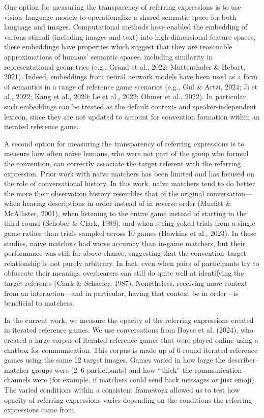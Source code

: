 \documentclass[10pt, letterpaper]{article}
\begin{document}
One option for measuring the transparency of referring expressions is to
use vision--language models to operationalize a shared semantic space
for both language and images. Computational methods have enabled the
embedding of various stimuli (including images and text) into
high-dimensional feature spaces; these embeddings have properties which
suggest that they are reasonable approximations of humans' semantic
spaces, including similarity in representational geometries (e.g., Grand
et al., 2022; Muttenthaler \& Hebart, 2021). Indeed, embeddings from
neural network models have been used as a form of semantics in a range
of reference game scenarios (e.g., Gul \& Artzi, 2024; Ji et al., 2022;
Kang et al., 2020; Le et al., 2022; Ohmer et al., 2022). In particular,
such embeddings can be treated as the default context- and
speaker-independent lexicon, since they are not updated to account for
convention formation within an iterated reference game.

A second option for measuring the transparency of referring expressions
is to measure how often naïve humans, who were not part of the group who
formed the convention, can correctly associate the target referent with
the referring expression. Prior work with naïve matchers has been
limited and has focused on the role of conversational history. In this
work, naïve matchers tend to do better the more their observation
history resembles that of the original conversation---when hearing
descriptions in order instead of in reverse order (Murfitt \&
McAllister, 2001), when listening to the entire game instead of starting
in the third round (Schober \& Clark, 1989), and when seeing yoked
trials from a single game rather than trials sampled across 10 games
(Hawkins et al., 2023). In these studies, naïve matchers had worse
accuracy than in-game matchers, but their performance was still far
above chance, suggesting that the convention--target relationship is not
purely arbitrary. In fact, even when pairs of participants try to
obfuscate their meaning, overhearers can still do quite well at
identifying the target referents (Clark \& Schaefer, 1987). Nonetheless,
receiving more context from an interaction---and in particular, having
that context be in order---is beneficial to matchers.

In the current work, we measure the opacity of the referring expressions
created in iterated reference games. We use conversations from Boyce et
al. (2024), who created a large corpus of iterated reference games that
were played online using a chatbox for communication. This corpus is
made up of 6-round iterated reference games using the same 12 target
images. Games varied in how large the describer--matcher groups were
(2--6 participants) and how ``thick'' the communication channels were
(for example, if matchers could send back messages or just emoji). The
varied conditions within a consistent framework allowed us to test how
opacity of referring expressions varies depending on the conditions the
referring expressions came from.
\end{document}
